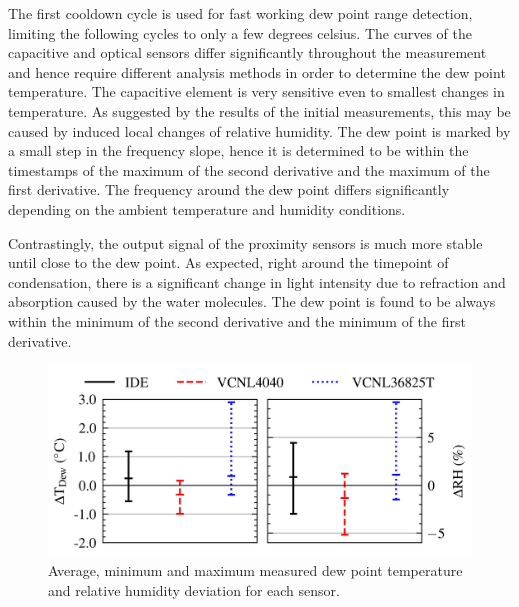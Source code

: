 \documentclass[conference,a4paper]{IEEEtran}
\newcommand{\squeezeup}{\vspace{-2mm}}
\begin{document}
The first cooldown cycle is used for fast working dew point range detection, limiting the following cycles to only a few degrees celsius. The curves of the capacitive and optical sensors differ significantly throughout the measurement and hence require different analysis methods in order to determine the dew point temperature. The capacitive element is very sensitive even to smallest changes in temperature. As suggested by the results of the initial measurements, this may be caused by induced local changes of relative humidity. The dew point is marked by a small step in the frequency slope, hence it is determined to be within the timestamps of the maximum of the second derivative and the maximum of the first derivative. The frequency around the dew point differs significantly depending on the ambient temperature and humidity conditions.

Contrastingly, the output signal of the proximity sensors is much more stable until close to the dew point. As expected, right around the timepoint of condensation, there is a significant change in light intensity due to refraction and absorption caused by the water molecules. The dew point is found to be always within the minimum of the second derivative and the minimum of the first derivative.

\begin{figure}
  \centering
  \includegraphics[width=\columnwidth]{graphs/sensorall_dew}
  \caption{Average, minimum and maximum measured dew point temperature and relative humidity deviation for each sensor.}
  \label{g:sensorall_dew}
  \squeezeup
\end{figure}
\end{document}
